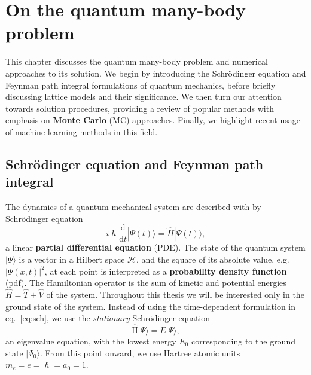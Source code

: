 
\chapter{On the quantum many-body problem}
\label{chapter2}
This chapter discusses the quantum many-body problem and numerical approaches to its solution. We begin by introducing the Schr\" odinger equation and Feynman path integral formulations of quantum mechanics, before briefly discussing lattice models and their significance. We then turn our attention towards solution procedures, providing a review of popular methods with emphasis on \textbf{Monte Carlo} (MC) approaches. Finally, we highlight recent usage of machine learning methods in this field.

\ifpdf
    \graphicspath{{Chapter2/Figs/Raster/}{Chapter2/Figs/PDF/}{Chapter2/Figs/}}
\else
    \graphicspath{{Chapter2/Figs/Vector/}{Chapter2/Figs/}}
\fi

\section{Schr{\"o}dinger equation and Feynman path integral}
\label{subsec:latt-qm}
The dynamics of a quantum mechanical system are described with by Schr\" odinger equation
\begin{equation}
\label{eq:sch}
i \hslash \frac{\mathrm{d}}{\mathrm{d} t}|\Psi(t)\rangle=\hat{H}|\Psi(t)\rangle,
\end{equation}
a linear \textbf{partial differential equation} (PDE). The state of the quantum system $| \Psi \rangle$ is a vector in a Hilbert space $\mathcal{H}$, and the square of its absolute value, e.g. $|\Psi(x, t)|^2$, at each point is interpreted as a \textbf{probability density function} (pdf). The Hamiltonian operator is the sum of kinetic and potential energies $\hat H = \hat T + \hat V$ of the system. Throughout this thesis we will be interested only in the ground state of the system. Instead of using the time-dependent formulation in eq.~\eqref{eq:sch}, we use the \emph{stationary} Schr\" odinger equation
\begin{equation}
\hat{\mathrm{H}}|\Psi\rangle=E|\Psi\rangle,
\end{equation}
an eigenvalue equation, with the lowest energy $E_0$ corresponding to the ground state $|\Psi_{0}\rangle$. From this point onward, we use Hartree atomic units $m_{e}=e=\hslash=a_{0}=1$.

